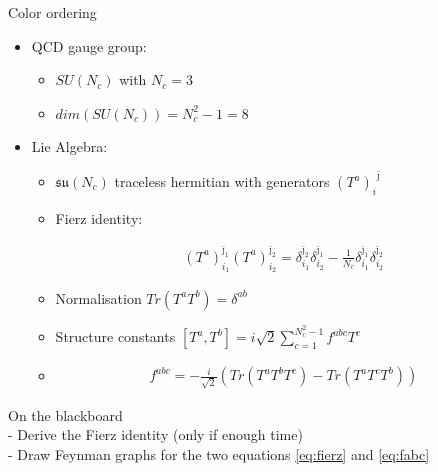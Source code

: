 \documentclass[10pt]{beamer}
\begin{document}
\begin{frame}[fragile]{Color ordering \cite{bg87colorordering}}

    \begin{itemize}[<+->]
    	\item[] QCD gauge group:
    	\begin{itemize}[<+->]
    	    \item $SU(N_c)$ with $N_c=3$
    	    \item $dim(SU(N_c))=N_c^2-1 = 8$
    	\end{itemize}
    	\item[] Lie Algebra:
    	    \begin{itemize}[<+->]
    	    \item $\mathfrak{su}(N_c)$ traceless hermitian with generators ${(T^a)_{i}}^{\bar{\jmath}}$
            \item Fierz identity:

            \begin{align}
                (T^a)_{i_1}^{\bar{\jmath}_1} (T^a)_{i_2}^{\bar{\jmath}_2} = \delta_{i_1}^{\bar{\jmath}_2} \delta_{i_2}^{\bar{\jmath}_1} - \frac{1}{N_c} \delta_{i_1}^{\bar{\jmath}_1} \delta_{i_2}^{\bar{\jmath}_2} \label{eq:fierz}
            \end{align}

    	    \item Normalisation $Tr(T^a T^b) = \delta^{ab}$

    	    \item Structure constants $[T^a, T^b] = i\sqrt{2} \sum_{c=1}^{N_c^2-1} f^{abc} T^c$

            \item[] \begin{align}
                f^{abc} = - \frac{i}{\sqrt{2}} \left( Tr(T^a T^b T^c) - Tr(T^a T^c T^b) \right) \label{eq:fabc}
            \end{align}

    	    \end{itemize}

    \end{itemize}

\end{frame}

{
\begin{frame}[standout]
    On the blackboard\\
    - Derive the Fierz identity (only if enough time) \\
    - Draw Feynman graphs for the two equations \eqref{eq:fierz} and \eqref{eq:fabc}
\end{frame}
}
\end{document}
